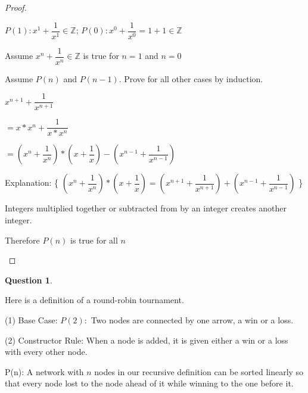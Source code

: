 \documentclass[11pt, oneside]{article}   	%
\newtheorem{Question}{Question}
\begin{document}
\begin{proof}
\begin{description}
\item[Base Case:] $P(1): x^1 + \dfrac{1}{x^1} \in \mathbb{Z}$; $P(0): x^0 + \dfrac{1}{x^0} = 1+1 \in \mathbb{Z}$
\item Assume $x^n + \dfrac{1}{x^n} \in \mathbb{Z}$ is true for $n=1$ and $n=0$

\item[Prove $P(n)\wedge P(n-1) \wedge P(1) \rightarrow P(n+1)$:] Assume $P(n)$ and $P(n-1)$. Prove for all other cases by induction.

$x^{n+1} + \dfrac{1}{x^{n+1}}$

$ = x*x^n + \dfrac{1}{x*x^n}$
 

$= (x^n + \dfrac{1}{x^n}) * (x+\dfrac{1}{x}) - (x^{n-1} + \dfrac{1}{x^{n-1}})$

Explanation: \{ $(x^n + \dfrac{1}{x^n}) * (x+\dfrac{1}{x}) = (x^{n+1} + \dfrac{1}{x^{n+1}}) + (x^{n-1} + \dfrac{1}{x^{n-1}})$ \}

Integers multiplied together or subtracted from by an integer creates another integer.

Therefore $P(n)$ is true for all $n$
\end{description}
\end{proof}


\begin{Question} %
\end{Question}

 Here is a definition of a round-robin tournament.

(1) Base Case: $P(2):$ Two nodes are connected by one arrow, a win or a loss. %

(2) Constructor Rule: When a node is added, it is given either a win or a loss with every other node.


P(n): A network with $n$ nodes in our recursive definition can be sorted linearly so that every node lost to the node ahead of it while winning to the one before it.
\end{document}
